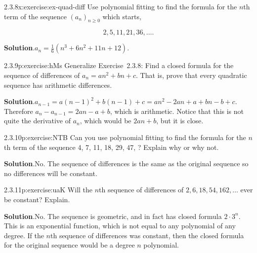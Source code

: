 \documentclass[twoside,11pt,]{book}
\newcommand{\blocktitlefont}{\relax}
\numberwithin{equation}{chapter}
\begin{document}
\begin{divisionsolution}{2.3.8}{}{x:exercise:ex-quad-diff}%
Use polynomial fitting to find the formula for the \(n\)th term of the sequence \((a_n)_{n \ge 0}\) which starts,%
\par
%
\begin{equation*}
2,5,11,21,36, \ldots 
\text{.}
\end{equation*}
%
\par\smallskip%
\noindent\textbf{\blocktitlefont Solution}.\quad{}\(a_n = \frac{1}{6} (n^3 + 6n^2 + 11n + 12)\text{.}\)%
\end{divisionsolution}%
\begin{divisionsolution}{2.3.9}{}{p:exercise:hMs}%
Generalize Exercise~2.3.8: Find a closed formula for the sequence of differences of \(a_n = an^2 + bn + c\). That is, prove that every quadratic sequence has arithmetic differences.%
\par\smallskip%
\noindent\textbf{\blocktitlefont Solution}.\quad{}\(a_{n-1} = a(n-1)^2 + b(n-1) + c = an^2 - 2an + a + bn - b + c\). Therefore \(a_n - a_{n-1} = 2an - a + b\), which is arithmetic. Notice that this is not quite the derivative of \(a_n\), which would be \(2an + b\), but it is close.%
\end{divisionsolution}%
\begin{divisionsolution}{2.3.10}{}{p:exercise:NTB}%
Can you use polynomial fitting to find the formula for the \(n\)th term of the sequence 4, 7, 11, 18, 29, 47, \textellipsis{}? Explain why or why not.%
\par\smallskip%
\noindent\textbf{\blocktitlefont Solution}.\quad{}No. The sequence of differences is the same as the original sequence so no differences will be constant.%
\end{divisionsolution}%
\begin{divisionsolution}{2.3.11}{}{p:exercise:uaK}%
Will the \(n\)th sequence of differences of \(2, 6, 18, 54, 162, \ldots\) ever be constant? Explain.%
\par\smallskip%
\noindent\textbf{\blocktitlefont Solution}.\quad{}No. The sequence is geometric, and in fact has closed formula \(2\cdot 3^n\). This is an exponential function, which is not equal to any polynomial of any degree. If the \(n\)th sequence of differences was constant, then the closed formula for the original sequence would be a degree \(n\) polynomial.%
\end{divisionsolution}%
\end{document}
